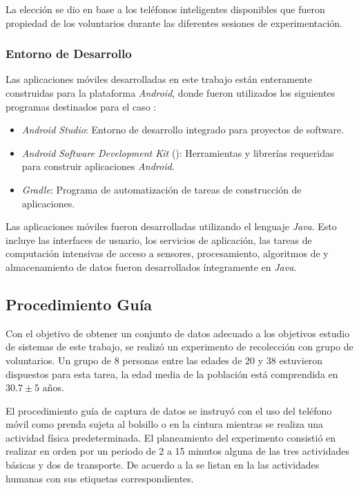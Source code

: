 La elección se dio en base a los teléfonos inteligentes disponibles
que fueron propiedad de los voluntarios durante las diferentes sesiones
de experimentación.

\subsubsection{Entorno de Desarrollo }

Las aplicaciones móviles desarrolladas en este trabajo están enteramente
construidas para la plataforma \emph{Android}, donde fueron utilizados
los siguientes programas destinados para el caso \cite{Android2016}:
\begin{itemize}
\item \emph{Android Studio}: Entorno de desarrollo integrado para proyectos\emph{
}de software.
\item \emph{Android} \emph{Software Development Kit }(): Herramientas
y librerías  requeridas para construir aplicaciones \emph{Android}.
\item \emph{Gradle}: Programa de automatización de tareas de construcción
de aplicaciones.
\end{itemize}
Las aplicaciones móviles fueron desarrolladas utilizando el lenguaje
\emph{Java}. Esto incluye las interfaces de usuario, los servicios
de aplicación, las tareas de computación intensivas de acceso a sensores,
procesamiento, algoritmos de  y almacenamiento de datos
fueron desarrollados íntegramente en \emph{Java}.

\subsection{Procedimiento Guía }

\label{ssec6:procedimiento}Con el objetivo de obtener un conjunto
de datos adecuado a los objetivos estudio de sistemas 
de este trabajo, se realizó un experimento de recolección con grupo
de voluntarios. Un grupo de 8 personas entre las edades de 20 y 38
estuvieron dispuestos para esta tarea, la edad media de la población
está comprendida en $30.7\pm5$ años. 

El procedimiento guía de captura de datos se instruyó con el uso del
teléfono móvil como prenda sujeta al bolsillo o en la cintura mientras
se realiza una actividad física predeterminada. El planeamiento del
experimento consistió en realizar en orden por un periodo de 2 a 15
minutos alguna de las tres actividades básicas y dos de transporte.
De acuerdo a la  se listan en la 
las actividades humanas con sus etiquetas correspondientes.

